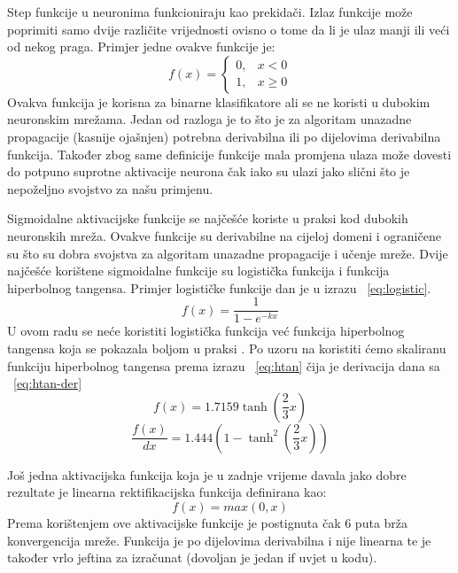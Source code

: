 \documentclass[times, utf8, zavrsni, numeric]{fer}
\begin{document}
Step funkcije u neuronima funkcioniraju kao prekidači. Izlaz funkcije može poprimiti samo dvije različite vrijednosti ovisno o tome da li je ulaz manji ili veći od nekog praga. Primjer jedne ovakve funkcije je:
\begin{equation}
  f(x) = \begin{cases}
    0, & \text{$x<0$}\\
    1, & \text{$x\geq0$}
  \end{cases}
\end{equation}
Ovakva funkcija je korisna za binarne klasifikatore ali se ne koristi u dubokim neuronskim mrežama. Jedan od razloga je to što je za algoritam unazadne propagacije (kasnije ojašnjen) potrebna derivabilna ili po dijelovima derivabilna funkcija. Također zbog same definicije funkcije mala promjena ulaza može dovesti do potpuno suprotne aktivacije neurona čak iako su ulazi jako slični što je nepoželjno svojstvo za našu primjenu.

Sigmoidalne aktivacijske funkcije se najčešće koriste u praksi kod dubokih neuronskih mreža. Ovakve funkcije su derivabilne na cijeloj domeni i ograničene su što su dobra svojstva za algoritam unazadne propagacije i učenje mreže. Dvije najčešće korištene sigmoidalne funkcije su logistička funkcija i funkcija hiperbolnog tangensa. Primjer logističke funkcije dan je u izrazu ~\ref{eq:logistic}. 
\begin{equation}\label{eq:logistic}
f(x) = \frac{1}{1-e^{-kx}}
\end{equation}
U ovom radu se neće koristiti logistička funkcija već funkcija hiperbolnog tangensa koja se pokazala boljom u praksi \citep{lecun1998gradient}. Po uzoru na \citep{lecun1998gradient} koristiti ćemo skaliranu funkciju hiperbolnog tangensa prema izrazu ~\ref{eq:htan} čija je derivacija dana sa ~\ref{eq:htan-der}
\begin{equation}\label{eq:htan}
f(x) = 1.7159\tanh\left(\frac{2}{3}x\right)
\end{equation}
\begin{equation}\label{eq:htan-der}
\dfrac{f(x)}{dx} = 1.444\left(1-\tanh^2\left(\frac{2}{3}x\right)\right)
\end{equation}

Još jedna aktivacijska funkcija koja je u zadnje vrijeme davala jako dobre rezultate je linearna rektifikacijska funkcija definirana kao:
\begin{equation}\label{eq:relu}
f(x) = max(0, x)
\end{equation}
Prema \citep{krizhevsky2012imagenet} korištenjem ove aktivacijske funkcije je postignuta čak 6 puta brža konvergencija mreže. Funkcija je po dijelovima derivabilna i nije linearna te je također vrlo jeftina za izračunat (dovoljan je jedan if uvjet u kodu).
\end{document}
